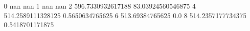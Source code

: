 0 nan nan
1 nan nan
2 596.7330932617188 83.03924560546875
4 514.2589111328125 0.5650634765625
6 513.69384765625 0.0
8 514.2357177734375 0.5418701171875
